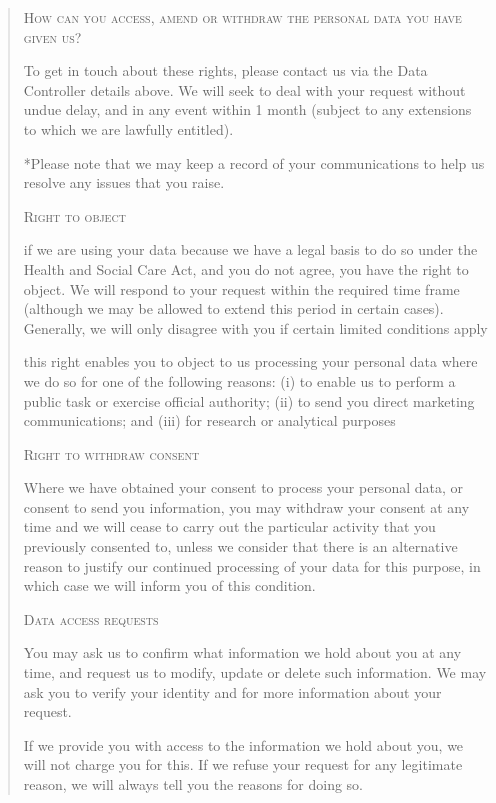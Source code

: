 \documentclass[twocolumn, letterpaper,13pt]{scrartcl}
\begin{document}
\begin{quote}
        \textsc{How can you access, amend or withdraw the personal data you have given us?}
        
        To get in touch about these rights, please contact us via the Data Controller details above. We will seek to deal with your request without undue delay, and in any event within 1 month (subject to any extensions to which we are lawfully entitled).
        
        *Please note that we may keep a record of your communications to help us resolve any issues that you raise.
        
        \textsc{Right to object}
        
        if we are using your data because we have a legal basis to do so under the Health and Social Care Act, and you do not agree, you have the right to object. We will respond to your request within the required time frame (although we may be allowed to extend this period in certain cases). Generally, we will only disagree with you if certain limited conditions apply
        
        this right enables you to object to us processing your personal data where we do so for one of the following reasons: (i) to enable us to perform a public task or exercise official authority; (ii) to send you direct marketing communications; and (iii) for research or analytical purposes
        
        \textsc{Right to withdraw consent}
        
        Where we have obtained your consent to process your personal data, or consent to send you information, you may withdraw your consent at any time and we will cease to carry out the particular activity that you previously consented to, unless we consider that there is an alternative reason to justify our continued processing of your data for this purpose, in which case we will inform you of this condition.
        
        \textsc{Data access requests}
        
        You may ask us to confirm what information we hold about you at any time, and request us to modify, update or delete such information. We may ask you to verify your identity and for more information about your request.
        
        If we provide you with access to the information we hold about you, we will not charge you for this. If we refuse your request for any legitimate reason, we will always tell you the reasons for doing so.
        

\end{quote}
\end{document}
